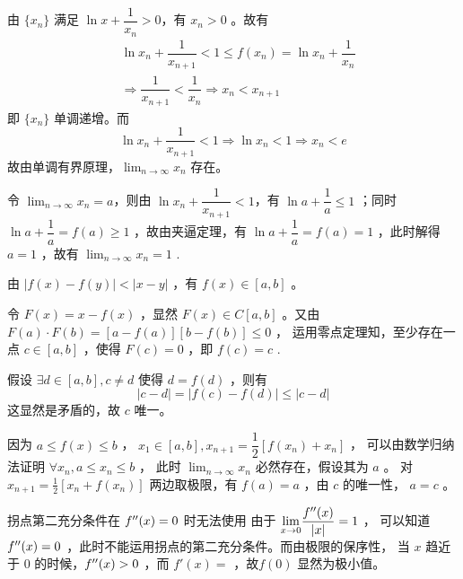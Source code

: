 \begin{Answer}
    由 $ \{x_n\} $ 满足 $ \ln x + \dfrac{1}{x_n} >0 $，有 $ x_n>0 $ 。故有
    \begin{equation*}
        \begin{aligned}
            &\ln x_n + \dfrac{1}{x_{n+1}} < 1 \leq f(x_n) =\ln x_n + \dfrac{1}{x_n} \\ 
            &\Rightarrow \dfrac{1}{x_{n+1}} < \dfrac{1}{x_n} \Rightarrow x_n < x_{n+1}
        \end{aligned}
    \end{equation*}
    即 $ \{x_n\} $ 单调递增。而 $$
        \ln x_n + \dfrac{1}{x_{n+1}} < 1 \Rightarrow \ln x_n < 1 \Rightarrow x_n < e
    $$
    故由单调有界原理，$ {\displaystyle\lim_{n\rightarrow \infty}}x_n $ 存在。

    令 $ {\displaystyle\lim_{n\rightarrow \infty}}x_n = a $，则由 $ \ln x_n + \dfrac{1}{x_{n+1}} <1  $，有
    $ \ln a + \dfrac{1}{a} \leq 1 $ ；同时 $ \ln a +\dfrac{1}{a} = f(a) \geq1 $ ，故由夹逼定理，有
    $ \ln a + \dfrac{1}{a}= f(a) = 1 $ ，此时解得 $ a = 1 $ ，故有 $ {\displaystyle\lim_{n\rightarrow \infty}}x_n = 1 $ .
\end{Answer}

\begin{Answer}
    由 $ |f(x)-f(y)|<|x-y| $ ，有 $ f(x)\in[a,b] $ 。

    令 $ F(x) = x - f(x) $ ，显然 $ F(x)\in C[a,b] $ 。又由 $ F(a)\cdot F(b) = [a-f(a)][b-f(b)]\leq 0 $ ，
    运用零点定理知，至少存在一点 $ c\in [a,b] $ ，使得 $ F(c) = 0 $ ，即 $ f(c) = c $ .

    假设 $ \exists d\in[a,b], c\neq d $ 使得 $ d = f(d) $ ，则有$$
        |c-d| = |f(c) - f(d)| \leq |c - d|
    $$ 这显然是矛盾的，故 $ c $ 唯一。

    因为 $ a \leq f(x) \leq b $ ， $ x_1 \in [a,b] , x_{n+1} = \dfrac{1}{2}[f(x_n)+x_n]  $ ，
    可以由数学归纳法证明 $ \forall x_n, a\leq x_n \leq b $ ，
    此时 $ {\displaystyle\lim_{n\rightarrow \infty}}x_n $ 必然存在，假设其为 $ a $ 。
    对 $ x_{n+1} = \frac12[x_n+f(x_n)] $ 两边取极限，有 $ f(a) = a $ ，由 $ c $ 的唯一性，
    $ a = c $ 。
\end{Answer}

\begin{answer}[C2T1]{拐点第二充分条件在 $ f^{\prime\prime}(x) = 0 $ 时无法使用}
    由于 $ \displaystyle {\displaystyle\lim_{x\rightarrow 0}}\dfrac{f^{\prime\prime}(x)}{|x|} = 1 $ ，
    可以知道 $ f^{\prime\prime}(x) = 0 $ ，此时不能运用拐点的第二充分条件。而由极限的保序性，
    当 $ x $ 趋近于 $ 0 $ 的时候，$ f^{\prime\prime}(x)>0 $ ，而 $ f'(x) = $ ，故$ f(0) $ 显然为极小值。
\end{answer}

